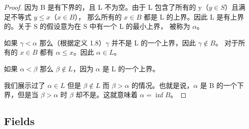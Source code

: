 \documentclass[../poma-notes.tex]{subfiles}
\begin{document}
\begin{proof}
	因为 B 是有下界的，且 L 不为空。由于 L 包含了所有的 y（$y \in S$）且满足不等式 $y \leq x$（$x \in B$），
	那么所有的 $x \in B$ 都是 L 的上界。因此 L 是有上界的。关于 S 的假设意为在 S 中有一个 L 的最小上界，
	被称为 $\alpha$。

	如果 $\gamma < \alpha$ 那么（根据定义 1.8）$\gamma$ 并不是 L 的一个上界，因此 $\gamma \notin B$。
	对于所有的 $x \in B$ 都有 $\alpha \le x$。因此 $\alpha \in L$。

	如果 $\alpha < \beta$ 那么 $\beta \notin L$，因为 $\alpha$ 是 L 的一个上界。

	我们展示过了 $\alpha \in L$ 但是 $\beta \notin L$ 而 $\beta > \alpha$ 的情况。也就是说，$\alpha$
	是 B 的一个下界，但是当 $\beta > \alpha$ 时 $\beta$ 却不是。这就意味着 $\alpha = \inf B$。
\end{proof}

\subsection*{Fields}
\end{document}
